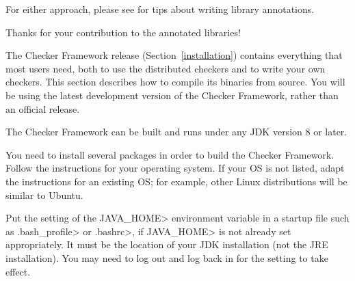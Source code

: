 For either approach, please see  for
tips about writing library annotations.

Thanks for your contribution to the annotated libraries!



The Checker Framework release (Section~\ref{installation}) contains
everything that most users need, both to use the distributed checkers and
to write your own checkers.  This section describes how to compile its
binaries from source.  You will be using the latest development version of
the Checker Framework, rather than an official release.


The Checker Framework can be built and runs under any JDK version 8 or later.



You need to install several packages in order to build the Checker
Framework.
Follow the instructions for your operating system.
If your OS is not listed, adapt the instructions for an existing OS;
for example, other Linux distributions will be similar to Ubuntu.

Put the setting of the \<JAVA\_HOME> environment variable in a startup file
such as \<.bash\_profile> or \<.bashrc>, if \<JAVA\_HOME> is not already
set appropriately.  It must be the location of your JDK
installation (not the JRE installation).
You may need to log out and log back in for the setting to take effect.

